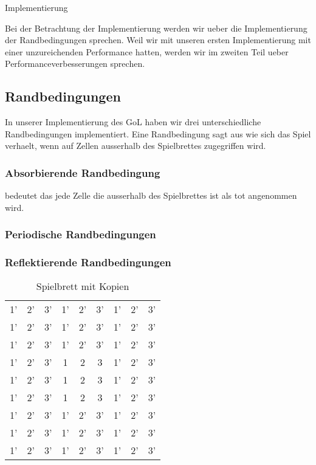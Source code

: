 \documentclass[runningheads]{llncs}
\begin{document}
\begin{section}{Implementierung}
    
    Bei der Betrachtung der Implementierung werden wir ueber die Implementierung der Randbedingungen sprechen.
    Weil wir mit unseren ersten Implementierung mit einer unzureichenden Performance hatten,
    werden wir im zweiten Teil ueber Performanceverbesserungen sprechen.
   
    

    \subsection{Randbedingungen}
        In unserer Implementierung des GoL haben wir drei unterschiedliche Randbedingungen implementiert.
        Eine Randbedingung sagt aus wie sich das Spiel verhaelt, wenn auf Zellen ausserhalb des Spielbrettes zugegriffen wird.
        
        \subsubsection{Absorbierende Randbedingung} bedeutet das jede Zelle die ausserhalb des Spielbrettes ist als tot angenommen wird.
        
        \subsubsection{Periodische Randbedingungen}

        \subsubsection{Reflektierende Randbedingungen}

        \begin{table}
            \centering
            \caption{Spielbrett mit Kopien}
            \label{boardMitSpiegelungen}
            \begin{tabular}{ | c c c | c c c | c c c | }
                \hline
                1' & 2' & 3' & 1' & 2' & 3' & 1' & 2' & 3' \\
                1' & 2' & 3' & 1' & 2' & 3' & 1' & 2' & 3' \\
                1' & 2' & 3' & 1' & 2' & 3' & 1' & 2' & 3' \\
                \hline
                1' & 2' & 3' & 1  & 2  & 3  & 1' & 2' & 3' \\
                1' & 2' & 3' & 1  & 2  & 3  & 1' & 2' & 3' \\
                1' & 2' & 3' & 1  & 2  & 3  & 1' & 2' & 3' \\
                \hline
                1' & 2' & 3' & 1' & 2' & 3' & 1' & 2' & 3' \\
                1' & 2' & 3' & 1' & 2' & 3' & 1' & 2' & 3' \\
                1' & 2' & 3' & 1' & 2' & 3' & 1' & 2' & 3' \\
                \hline
            \end{tabular}
        \end{table}


\end{section}
\end{document}
